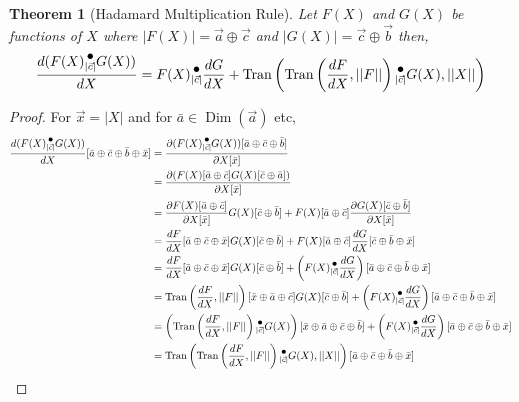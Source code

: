 \documentclass[12pt]{book}
\theoremstyle{plain}
\newtheorem{theorem}{Theorem}[chapter]
\theoremstyle{definition}
\theoremstyle{ppart}
\theoremstyle{case}
\theoremstyle{solution}
\DeclareMathOperator{\Dim}{Dim}
\DeclareMathOperator{\Tran}{Tran}
\newcommand{\dmult}[1]{\text{\raisebox{1ex}{$\underset{#1}{\,\bullet\,}$}}}
\newcommand{\shape}[1]{\left|#1\right|}
\begin{document}
\begin{theorem}[Hadamard Multiplication Rule]
\label{hadamard_rule}
Let $F(X)$ and $G(X)$ be functions of $X$ where
$\shape{F(X)} = \vec{a} \oplus \vec{c}$ and $\shape{G(X)} = \vec{c} \oplus \vec{b}$
then,
\[
  \frac{d(F(X) \dmult{\shape{\vec{c}}} G(X))}{dX} =
    F(X) \dmult{\shape{\vec{c}}} \frac{dG}{dX} +
    \Tran\left(\Tran\left(\frac{dF}{dX}, \shape{\shape{F}}\right) \dmult{\shape{\vec{c}}} G(X), \shape{\shape{X}}\right)
\]
\end{theorem}
\begin{landscape}
\begin{proof}
For $\vec{x} = \shape{X}$ and for $\bar{a} \in \Dim(\vec{a})$ etc,
\begin{align*}
\frac{d(F(X) \dmult{\shape{\vec{c}}} G(X))}{dX}[\bar{a} \oplus \bar{c} \oplus \bar{b} \oplus \bar{x}]
  &= \frac{\partial (F(X) \dmult{\shape{\vec{c}}} G(X))[\bar{a} \oplus \bar{c} \oplus \bar{b}]}{\partial X[\bar{x}]} \\
  &= \frac{\partial (F(X)[\bar{a} \oplus \bar{c}] G(X)[\bar{c} \oplus \bar{a}])}{\partial X[\bar{x}]} \\
  &= \frac{\partial F(X)[\bar{a} \oplus \bar{c}]}{\partial X[\bar{x}]} G(X)[\bar{c} \oplus \bar{b}]
    + F(X)[\bar{a} \oplus \bar{c}] \frac{\partial G(X)[\bar{c} \oplus \bar{b}]}{\partial X[\bar{x}]} \\
  &= \frac{dF}{dX}[\bar{a} \oplus \bar{c} \oplus \bar{x}] G(X)[\bar{c} \oplus \bar{b}]
    + F(X)[\bar{a} \oplus \bar{c}] \frac{dG}{dX}[\bar{c} \oplus \bar{b} \oplus \bar{x}] \\
  &= \frac{dF}{dX}[\bar{a} \oplus \bar{c} \oplus \bar{x}] G(X)[\bar{c} \oplus \bar{b}]
    + \left(F(X) \dmult{\shape{\vec{c}}} \frac{dG}{dX}\right)[\bar{a} \oplus \bar{c} \oplus \bar{b} \oplus \bar{x}] \\
  &= \Tran\left(\frac{dF}{dX}, \shape{\shape{F}}\right)[\bar{x} \oplus \bar{a} \oplus \bar{c}] G(X)[\bar{c} \oplus \bar{b}]
    + \left(F(X) \dmult{\shape{\vec{c}}} \frac{dG}{dX}\right)[\bar{a} \oplus \bar{c} \oplus \bar{b} \oplus \bar{x}] \\
  &= \left(\Tran\left(\frac{dF}{dX}, \shape{\shape{F}}\right) \dmult{\shape{\vec{c}}} G(X)\right) [\bar{x} \oplus \bar{a} \oplus \bar{c} \oplus \bar{b}]
    + \left(F(X) \dmult{\shape{\vec{c}}} \frac{dG}{dX}\right)[\bar{a} \oplus \bar{c} \oplus \bar{b} \oplus \bar{x}] \\
  &= \Tran\left(\Tran\left(\frac{dF}{dX}, \shape{\shape{F}}\right) \dmult{\shape{\vec{c}}} G(X), \shape{\shape{X}}\right) [\bar{a} \oplus \bar{c} \oplus \bar{b} \oplus \bar{x}]

\end{align*}
\end{proof}
\end{landscape}
\end{document}
